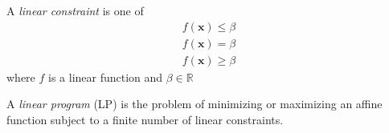 \begin{defbox}
    \begin{definition}
        A \emph{linear constraint} is one of
        \begin{align*}
            f(\bm{x})\leqslant \beta \\
            f(\bm{x})=\beta    \\
            f(\bm{x})\geqslant  \beta
        \end{align*}
        where $f$ is a linear function and $ \beta\in\mathbb{R} $
    \end{definition}
\end{defbox}

\begin{defbox}
    \begin{definition}
        A \emph{linear program} (LP) is the problem of minimizing or
        maximizing an affine function subject to a finite number
        of linear constraints.
    \end{definition}
\end{defbox}
